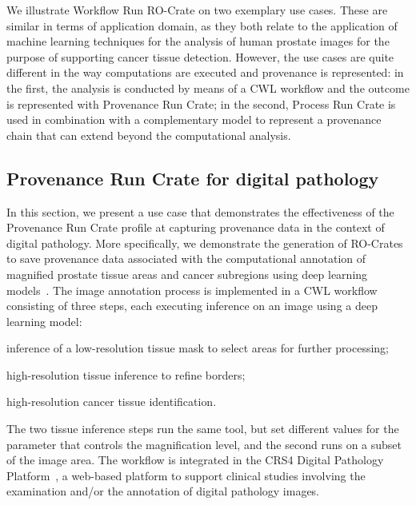 \documentclass[10pt,letterpaper]{article}
\begin{document}
We illustrate Workflow Run RO-Crate on two exemplary use cases. These are similar in terms of application domain, as they both relate to the application of machine learning techniques for the analysis of human prostate images for the purpose of supporting cancer tissue detection. However, the use cases are quite different in the way computations are executed and provenance is represented: in the first, the analysis is conducted by means of a CWL workflow and the outcome is represented with Provenance Run Crate; in the second, Process Run Crate is used in combination with a complementary model to represent a provenance chain that can extend beyond the computational analysis.


\subsection{Provenance Run Crate for digital pathology}\label{provenance-run-crate-for-digital-pathology}

In this section, we present a use case that demonstrates the effectiveness of the Provenance Run Crate profile at capturing provenance data in the context of digital pathology.
More specifically, we demonstrate the generation of RO-Crates to save provenance data associated with the computational annotation of magnified prostate tissue areas and cancer subregions using deep learning models~\cite{Del Rio 2022}.
The image annotation process is implemented in a CWL workflow consisting of three steps, each executing inference on an image using a deep learning model: \begin{inlineenum}
\item inference of a low-resolution tissue mask to select areas for further processing;
\item high-resolution tissue inference to refine borders;
\item high-resolution cancer tissue identification.
\end{inlineenum}
The two tissue inference steps run the same tool, but set different values for the parameter that controls the magnification level, and the second runs on a subset of the image area.
The workflow is integrated in the CRS4 Digital Pathology Platform~\cite{digital-pathology-platform}, a web-based platform to support clinical studies involving the examination and/or the annotation of digital pathology images.
\end{document}
